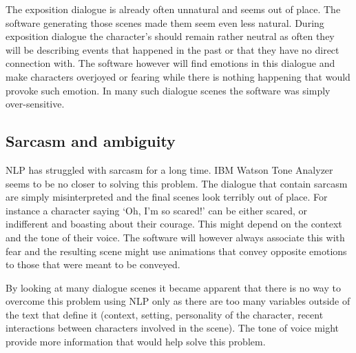 The exposition dialogue is already often unnatural and seems out of place. The software generating those scenes made them seem even less natural. During exposition dialogue the character's should remain rather neutral as often they will be describing events that happened in the past or that they have no direct connection with. The software however will find emotions in this dialogue and make characters overjoyed or fearing while there is nothing happening that would provoke such emotion. In many such dialogue scenes the software was simply over-sensitive.


\subsection{Sarcasm and ambiguity}
NLP has struggled with sarcasm for a long time. IBM Watson Tone Analyzer seems to be no closer to solving this problem. The dialogue that contain sarcasm are simply misinterpreted and the final scenes look terribly out of place. For instance a character saying `Oh, I'm so scared!' can be either scared, or indifferent and boasting about their courage. This might depend on the context and the tone of their voice. The software will however always associate this with fear and the resulting scene might use animations that convey opposite emotions to those that were meant to be conveyed.

By looking at many dialogue scenes it became apparent that there is no way to overcome this problem using NLP only as there are too many variables outside of the text that define it (context, setting, personality of the character, recent interactions between characters involved in the scene). The tone of voice might provide more information that would help solve this problem.


